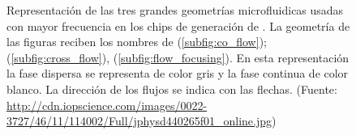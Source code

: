\begin{figure}[h]
\captionsetup[subfigure]{labelformat=empty}
  \begin{center} 
  
      
      
  \end{center}
  \hspace{-7mm}
  \caption{\small Representación de las tres grandes geometrías microfluidicas usadas con mayor frecuencia en los chips de generación de \gotas. La geometría de las figuras reciben los nombres de 
  (\ref{subfig:co_flow}); 
  (\ref{subfig:cross_flow}), 
   (\ref{subfig:flow_focusing}). 
  En esta representación la fase dispersa se representa de color gris y la fase continua de color blanco. La dirección de los flujos se indica con las flechas. (Fuente: \url{http://cdn.iopscience.com/images/0022-3727/46/11/114002/Full/jphysd440265f01_online.jpg})
  }
  \label{fig:geometria_chips}
\end{figure}


